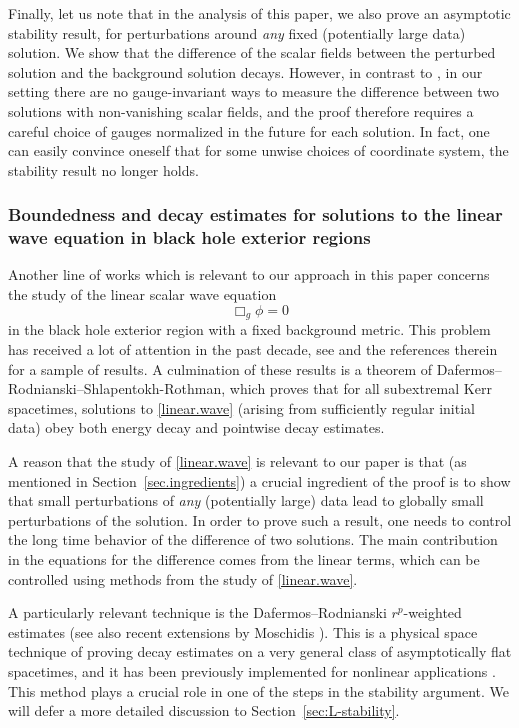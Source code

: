 \documentclass[10pt, reqno]{amsart}
\theoremstyle{definition}
\theoremstyle{remark}
\theoremstyle{conjecture}
\numberwithin{equation}{section}
\newcommand{\0}{\emptyset}
\begin{document}
Finally, let us note that in the analysis of this paper, we also prove an asymptotic stability result, for perturbations around \emph{any} fixed (potentially large data) solution. We show that the difference of the scalar fields between the perturbed solution and the background solution decays. However, in contrast to \cite{DRPL}, in our setting there are no gauge-invariant ways to measure the difference between two solutions with non-vanishing scalar fields, and the proof therefore requires a careful choice of gauges normalized in the future for each solution. In fact, one can easily convince oneself that for some unwise choices of coordinate system, the stability result no longer holds.

\subsubsection{Boundedness and decay estimates for solutions to the linear wave equation in black hole exterior regions}\label{sec.linear}
 
Another line of works which is relevant to our approach in this paper concerns the study of the linear scalar wave equation
\begin{equation}\label{linear.wave}
\Box_g\phi=0
\end{equation}
in the black hole exterior region with a fixed background metric. This problem has received a lot of attention in the past decade, see \cite{Are11a, Are12, AB, BSt, DRS, DRK, DRL, DRNM, DRSR, DHR, MMTT, MTT, Ta, TT} and the references therein for a sample of results. A culmination of these results is a theorem of Dafermos--Rodnianski--Shlapentokh-Rothman, which proves that for all subextremal Kerr spacetimes, solutions to \eqref{linear.wave} (arising from sufficiently regular initial data) obey both energy decay and pointwise decay estimates.

A reason that the study of \eqref{linear.wave} is relevant to our paper is that (as mentioned in Section~\ref{sec.ingredients}) a crucial ingredient of the proof is to show that small perturbations of \emph{any} (potentially large) data lead to globally small perturbations of the solution. In order to prove such a result, one needs to control the long time behavior of the difference of two solutions. The main contribution in the equations for the difference comes from the linear terms, which can be controlled using methods from the study of \eqref{linear.wave}.

A particularly relevant technique is the Dafermos--Rodnianski $r^p$-weighted estimates \cite{DRNM} (see also recent extensions by Moschidis \cite{Mos.rp}). This is a physical space technique of proving decay estimates on a very general class of asymptotically flat spacetimes, and it has been previously implemented for nonlinear applications \cite{Yang}. This method plays a crucial role in one of the steps in the stability argument. We will defer a more detailed discussion to Section~\ref{sec:L-stability}.
\end{document}
